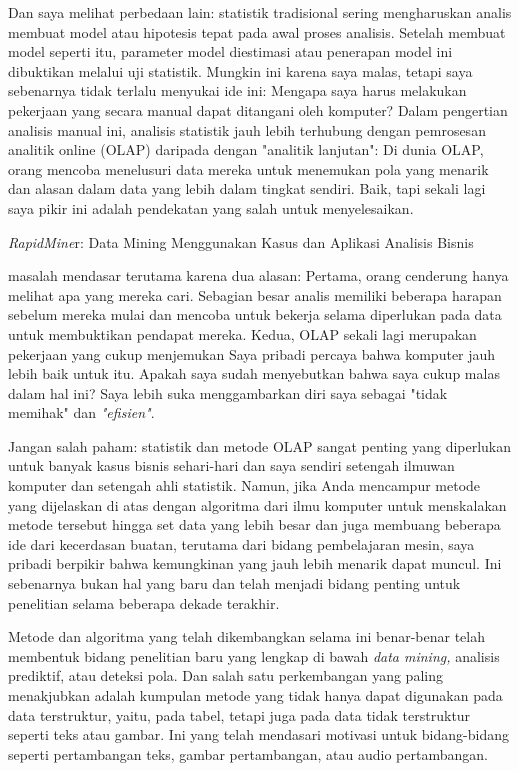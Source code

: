 \par Dan saya melihat perbedaan lain: statistik tradisional sering mengharuskan analis membuat model atau hipotesis tepat pada awal proses analisis. Setelah membuat model seperti itu, parameter model diestimasi atau penerapan model ini dibuktikan melalui uji statistik. Mungkin ini karena saya malas, tetapi saya sebenarnya tidak terlalu menyukai ide ini: Mengapa saya harus melakukan pekerjaan yang secara manual dapat ditangani oleh komputer? Dalam pengertian analisis manual ini, analisis statistik jauh lebih terhubung dengan pemrosesan analitik online (OLAP) daripada dengan "analitik lanjutan": Di dunia OLAP, orang mencoba menelusuri data mereka untuk menemukan pola yang menarik dan alasan dalam data yang lebih dalam tingkat sendiri. Baik, tapi sekali lagi saya pikir ini adalah pendekatan yang salah untuk menyelesaikan.

   \textit{ RapidMine}r: Data Mining Menggunakan Kasus dan Aplikasi Analisis Bisnis
   
   \par  masalah mendasar terutama karena dua alasan: Pertama, orang cenderung hanya melihat apa yang mereka cari. Sebagian besar analis memiliki beberapa harapan sebelum mereka mulai dan mencoba untuk bekerja selama diperlukan pada data untuk membuktikan pendapat mereka. Kedua, OLAP sekali lagi merupakan pekerjaan yang cukup menjemukan Saya pribadi percaya bahwa komputer jauh lebih baik untuk itu. Apakah saya sudah menyebutkan bahwa saya cukup malas dalam hal ini? Saya lebih suka menggambarkan diri saya sebagai "tidak memihak" dan \textit{"efisien"}.
   
   \par       Jangan salah paham: statistik dan metode OLAP sangat penting yang diperlukan untuk banyak kasus bisnis sehari-hari dan saya sendiri setengah ilmuwan komputer dan setengah ahli statistik. Namun, jika Anda mencampur metode yang dijelaskan di atas dengan algoritma dari ilmu komputer untuk menskalakan metode tersebut hingga set data yang lebih besar dan juga membuang beberapa ide dari kecerdasan buatan, terutama dari bidang pembelajaran mesin, saya pribadi berpikir bahwa kemungkinan yang jauh lebih menarik dapat muncul. Ini sebenarnya bukan hal yang baru dan telah menjadi bidang penting untuk penelitian selama beberapa dekade terakhir.
   
   \par  Metode dan algoritma yang telah dikembangkan selama ini benar-benar telah membentuk bidang penelitian baru yang lengkap di bawah \textit{data mining,} analisis prediktif, atau deteksi pola. Dan salah satu perkembangan yang paling menakjubkan adalah kumpulan metode yang tidak hanya dapat digunakan pada data terstruktur, yaitu, pada tabel, tetapi juga pada data tidak terstruktur seperti teks atau gambar. Ini yang telah mendasari motivasi untuk bidang-bidang seperti pertambangan teks, gambar pertambangan, atau audio pertambangan. 
   
